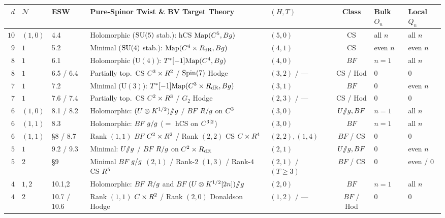 \begin{table}[H]
\centering
\scriptsize
\setlength{\tabcolsep}{2.9pt}
\renewcommand{\arraystretch}{1.12}
\begin{tabularx}{\textwidth}{@{}rll>{\raggedright\arraybackslash}Xlcll@{}}
\toprule
$d$ & $\mathcal{N}$ & \textbf{ESW} & \textbf{Pure-Spinor Twist \& BV Target Theory} & $(H,T)$ & \textbf{Class} & \textbf{Bulk $O_n$} & \textbf{Local $Q_n$} \\
\midrule
$10$ & $(1,0)$ & 4.4 & Holomorphic ($\operatorname{SU}(5)$ stab.): hCS $\mathrm{Map}(C^5,Bg)$ & $(5,0)$ & CS & all $n$ & all $n$ \\
$9$ & $1$ & 5.2 & Minimal ($\operatorname{SU}(4)$ stab.): $\mathrm{Map}(C^4\times R_{\mathrm{dR}},Bg)$ & $(4,1)$ & CS & even $n$ & even $n$ \\
$8$ & $1$ & 6.1 & Holomorphic ($\mathrm{U}(4)$): $T^*[-1]\mathrm{Map}(C^4,Bg)$ & $(4,0)$ & $BF$ & $n=1$ & all $n$ \\
$8$ & $1$ & 6.5 / 6.4 & Partially top.\ CS $C^3\times R^2$ / $\operatorname{Spin}(7)$ Hodge & $(3,2)$ / --- & CS / Hod & $0$ & $0$ \\
$7$ & $1$ & 7.2 & Minimal ($\mathrm{U}(3)$): $T^*[-1]\mathrm{Map}(C^3\times R_{\mathrm{dR}},Bg)$ & $(3,1)$ & $BF$ & $0$ & even $n$ \\
$7$ & $1$ & 7.6 / 7.4 & Partially top.\ CS $C^2\times R^3$ / $G_2$ Hodge & $(2,3)$ / --- & CS / Hod & $0$ & $0$ \\
$6$ & $(1,0)$ & 8.1 / 8.2 & Holomorphic: $(U\otimes K^{1/2})/\mkern-6mu/g$ / $BF$ $R/g$ on $C^3$ & $(3,0)$ & $U/\mkern-6mu/g, BF$ & $n=1$ & all $n$ \\
$6$ & $(1,1)$ & 8.3 & Holomorphic: $BF$ $g/g$ ($=$ hCS on $C^{3|2}$) & $(3,0)$ & $BF$ & $n=1$ & all $n$ \\
$6$ & $(1,1)$ & \S8 / 8.7 & Rank $(1,1)$ $BF$ $C^2\times R^2$ / Rank $(2,2)$ CS $C\times R^4$ & $(2,2),(1,4)$ & $BF$ / CS & $0$ & $0$ \\
$5$ & $1$ & 9.2 / 9.3 & Minimal: $U/\mkern-6mu/g$ / $BF$ $R/g$ on $C^2\times R_{\mathrm{dR}}$ & $(2,1)$ & $U/\mkern-6mu/g, BF$ & $0$ & even $n$ \\
$5$ & $2$ & \S9 & Minimal $BF$ $g/g$ $(2,1)$ / Rank-$2$ $(1,3)$ / Rank-$4$ CS $R^5$ & $(2,1)$ / $(T{\ge}3)$ & $BF$ / CS & $0$ & even / $0$ \\
$4$ & $1, 2$ & 10.1,2 & Holomorphic: $BF$ $R/g$ and $BF$ $(U\otimes K^{1/2}[2n])/\mkern-6mu/g$ & $(2,0)$ & $BF$ & $n=1$ & all $n$ \\
$4$ & $2$ & 10.7 / 10.6 & Rank $(1,1)$ $C\times R^2$ / Rank $(2,0)$ Donaldson Hodge & $(1,2)$ / --- & $BF$ / Hod & $0$ & $0$ \\

\end{tabularx}
\end{table}
